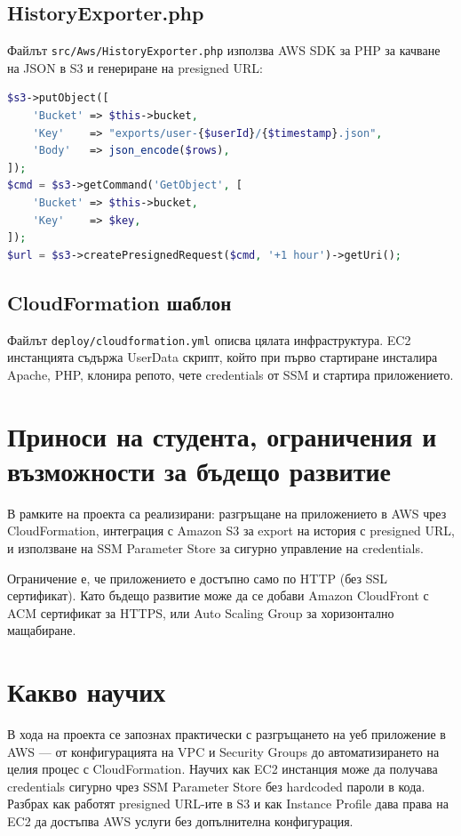 \documentclass[12pt]{article}
\begin{document}
\subsection{HistoryExporter.php}

Файлът \texttt{src/Aws/HistoryExporter.php} използва AWS SDK за PHP за качване на JSON в S3 и генериране на presigned URL:

\begin{lstlisting}[language=php]
$s3->putObject([
    'Bucket' => $this->bucket,
    'Key'    => "exports/user-{$userId}/{$timestamp}.json",
    'Body'   => json_encode($rows),
]);
$cmd = $s3->getCommand('GetObject', [
    'Bucket' => $this->bucket,
    'Key'    => $key,
]);
$url = $s3->createPresignedRequest($cmd, '+1 hour')->getUri();
\end{lstlisting}

\subsection{CloudFormation шаблон}

Файлът \texttt{deploy/cloudformation.yml} описва цялата инфраструктура. EC2 инстанцията съдържа UserData скрипт, който при първо стартиране инсталира Apache, PHP, клонира репото, чете credentials от SSM и стартира приложението.


\section{Приноси на студента, ограничения и възможности за бъдещо развитие}

В рамките на проекта са реализирани: разгръщане на приложението в AWS чрез CloudFormation, интеграция с Amazon S3 за export на история с presigned URL, и използване на SSM Parameter Store за сигурно управление на credentials.

\medskip

\noindent Ограничение е, че приложението е достъпно само по HTTP (без SSL сертификат). Като бъдещо развитие може да се добави Amazon CloudFront с ACM сертификат за HTTPS, или Auto Scaling Group за хоризонтално мащабиране.


\section{Какво научих}

В хода на проекта се запознах практически с разгръщането на уеб приложение в AWS — от конфигурацията на VPC и Security Groups до автоматизирането на целия процес с CloudFormation. Научих как EC2 инстанция може да получава credentials сигурно чрез SSM Parameter Store без hardcoded пароли в кода. Разбрах как работят presigned URL-ите в S3 и как Instance Profile дава права на EC2 да достъпва AWS услуги без допълнителна конфигурация.
\end{document}

